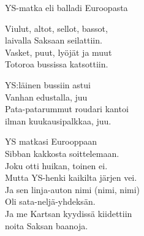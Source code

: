 \begin{song}{YS-matka eli balladi Euroopasta}

    Viulut, altot, sellot, bassot,\\
    laivalla Saksaan seilattiin.\\
    Vasket, puut, lyöjät ja muut\\
    Totoroa bussissa katsottiin.

    YS:läinen bussiin astui\\
    Vanhan edustalla, juu\\
    Pata-patarummut roudari kantoi\\
    ilman kuukausipalkkaa, juu.

    YS matkasi Eurooppaan\\
    Sibban kakkosta soittelemaan.\\
    Joku otti huikan, toinen ei.\\
    Mutta YS-henki kaikilta järjen vei.\\
    Ja sen linja-auton nimi (nimi, nimi)\\
    Oli sata-neljä-yhdeksän.\\
    Ja me Kartsan kyydissä kiidettiin\\
    noita Saksan baanoja.

\end{song}